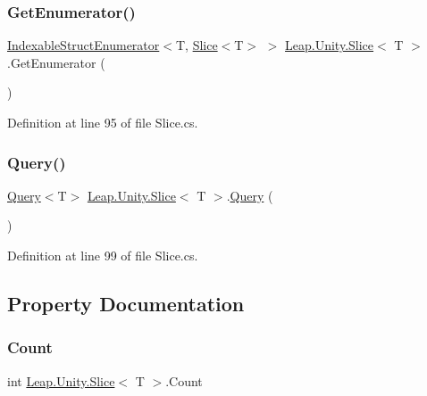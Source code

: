 \subsubsection{\texorpdfstring{GetEnumerator()}{GetEnumerator()}}
{\footnotesize\ttfamily \mbox{\hyperlink{struct_leap_1_1_unity_1_1_indexable_struct_enumerator}{Indexable\+Struct\+Enumerator}}$<$T, \mbox{\hyperlink{struct_leap_1_1_unity_1_1_slice}{Slice}}$<$T$>$ $>$ \mbox{\hyperlink{struct_leap_1_1_unity_1_1_slice}{Leap.\+Unity.\+Slice}}$<$ T $>$.Get\+Enumerator (\begin{DoxyParamCaption}{ }\end{DoxyParamCaption})}



Definition at line 95 of file Slice.\+cs.

\mbox{\label{struct_leap_1_1_unity_1_1_slice_af8014899e4741b106ae87871d0018ba1}} 
\subsubsection{\texorpdfstring{Query()}{Query()}}
{\footnotesize\ttfamily \mbox{\hyperlink{struct_leap_1_1_unity_1_1_query_1_1_query}{Query}}$<$T$>$ \mbox{\hyperlink{struct_leap_1_1_unity_1_1_slice}{Leap.\+Unity.\+Slice}}$<$ T $>$.\mbox{\hyperlink{struct_leap_1_1_unity_1_1_query_1_1_query}{Query}} (\begin{DoxyParamCaption}{ }\end{DoxyParamCaption})}



Definition at line 99 of file Slice.\+cs.



\subsection{Property Documentation}
\mbox{\label{struct_leap_1_1_unity_1_1_slice_a781fdd1cd77c558054e6bfd1ef60444d}} 
\subsubsection{\texorpdfstring{Count}{Count}}
{\footnotesize\ttfamily int \mbox{\hyperlink{struct_leap_1_1_unity_1_1_slice}{Leap.\+Unity.\+Slice}}$<$ T $>$.Count\hspace{0.3cm}{\ttfamily [get]}}



